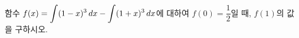 함수 $f(x)=\displaystyle\int (1-x)^3\mkern3mu dx-\int (1+x)^3\mkern3mu dx$에 대하여 $f(0)=\dfrac{1}{2}$일 때, $f(1)$의 값을 구하시오.
